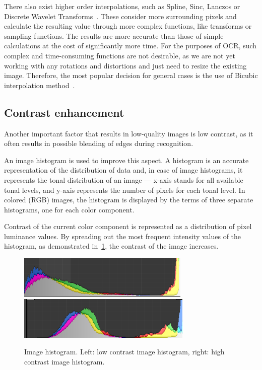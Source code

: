 There also exist higher order interpolations, such as Spline, Sinc, Lanczos or Discrete Wavelet Transforms~\cite{interpolation}. These consider more surrounding pixels and calculate the resulting value through more complex functions, like transforms or sampling functions. The results are more accurate than those of simple calculations at the cost of significantly more time. For the purposes of OCR, such complex and time-consuming functions are not desirable, as we are not yet working with any rotations and distortions and just need to resize the existing image. Therefore, the most popular decision for general cases is the use of Bicubic interpolation method~\cite{interpolationComp}.

\subsection{Contrast enhancement} \label{contrastEnhancemet}

Another important factor that results in low-quality images is low contrast, as it often results in possible blending of edges during recognition.

An image histogram is used to improve this aspect. A histogram is an accurate representation of the distribution of data and, in case of image histograms, it represents the tonal distribution of an image --- x-axis stands for all available tonal levels, and y-axis represents the number of pixels for each tonal level. In colored (RGB) images, the histogram is displayed by the terms of three separate histograms, one for each color component.

Contrast of the current color component is represented as a distribution of pixel luminance values. By spreading out the most frequent intensity values of the histogram, as demonstrated in~\cref{fig:preprocessContrastComparison}, the contrast of the image increases.

\begin{figure}[t]
\centering
\includegraphics[width=0.4\linewidth]{img/preprocessing//histogram_low.png}
\qquad
\includegraphics[width=0.4\linewidth]{img/preprocessing/histogram_high.png}
\caption{Image histogram. Left: low contrast image histogram, right: high contrast image histogram.}
\label{fig:preprocessContrastComparison}
\end{figure}

